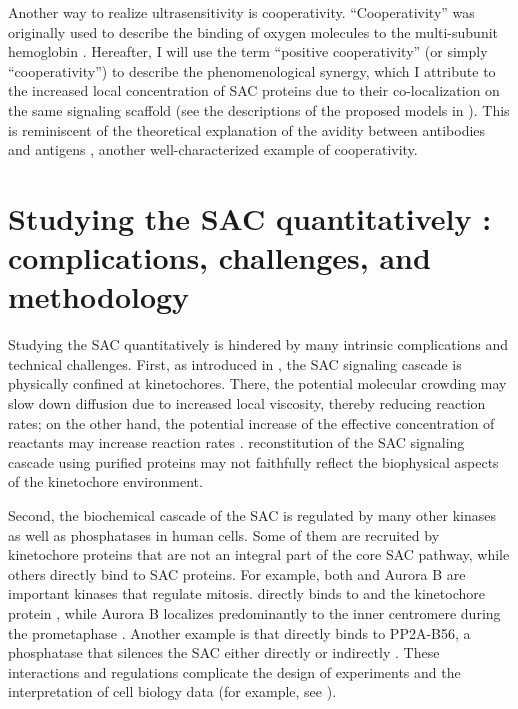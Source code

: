 Another way to realize ultrasensitivity is cooperativity. ``Cooperativity'' was originally used to describe the binding of oxygen molecules to the multi-subunit hemoglobin \cite{KNF, MWC}. Hereafter, I will use the term ``positive cooperativity'' (or simply ``cooperativity'') to describe the phenomenological synergy, which I attribute to the increased local concentration of SAC proteins due to their co-localization on the same signaling scaffold (see the descriptions of the proposed models in ). This is reminiscent of the theoretical explanation of the avidity between antibodies and antigens \cite{AvidityMath}, another well-characterized example of cooperativity.

\section{Studying the SAC quantitatively : complications, challenges, and methodology}
\label{TechnicalChallenges}

Studying the SAC quantitatively  is hindered by many intrinsic complications and technical challenges. First, as introduced in , the SAC signaling cascade is physically confined at kinetochores. There, the potential molecular crowding may slow down diffusion due to increased local viscosity, thereby reducing reaction rates; on the other hand, the potential increase of the effective concentration of reactants may increase reaction rates \cite{MolecularCrowding}.  reconstitution of the SAC signaling cascade using purified proteins may not faithfully reflect the biophysical aspects of the kinetochore environment.

Second, the biochemical cascade of the SAC is regulated by many other kinases as well as phosphatases in human cells. Some of them are recruited by kinetochore proteins that are not an integral part of the core SAC pathway, while others directly bind to SAC proteins. For example, both  and Aurora B are important kinases that regulate mitosis.  directly binds to  and the kinetochore protein  \cite{CENPU+BUB1-PLK1}, while Aurora B localizes predominantly to the inner centromere during the prometaphase \cite{BUB1_pH2A_AuroraB}. Another example is that  directly binds to PP2A-B56, a phosphatase that silences the SAC either directly \cite{PP2ADephosphorylatesKNL1, PP2ADephosphorylatesBUB1} or indirectly \cite{BUBR1_KT-MT, Suijkerbuijk2012, BUBR1-L669A+I672A, PP2A-B56-BUBR1ChromosomeCongression_Xu2013, PP2A-B56}. These interactions and regulations complicate the design of  experiments and the interpretation of cell biology data (for example, see ).

